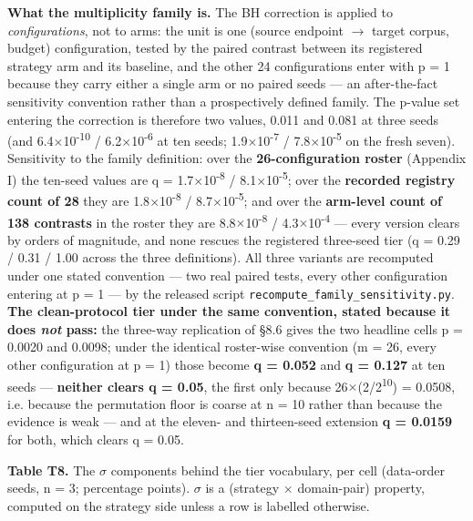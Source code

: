\documentclass[pdflatex,sn-mathphys-ay]{sn-jnl}
\begin{document}
\textbf{What the multiplicity family is.} The BH correction is applied to \emph{configurations}, not to arms: the unit is one (source endpoint \ensuremath{\rightarrow} target corpus, budget) configuration, tested by the paired contrast between its registered strategy arm and its baseline, and the other 24 configurations enter with p = 1 because they carry either a single arm or no paired seeds --- an after-the-fact sensitivity convention rather than a prospectively defined family. The p-value set entering the correction is therefore two values, 0.011 and 0.081 at three seeds (and 6.4\ensuremath{\times}10\textsuperscript{-10} / 6.2\ensuremath{\times}10\textsuperscript{-6} at ten seeds; 1.9\ensuremath{\times}10\textsuperscript{-7} / 7.8\ensuremath{\times}10\textsuperscript{-5} on the fresh seven). Sensitivity to the family definition: over the \textbf{26-configuration roster} (Appendix I) the ten-seed values are q = 1.7\ensuremath{\times}10\textsuperscript{-8} / 8.1\ensuremath{\times}10\textsuperscript{-5}; over the \textbf{recorded registry count of 28} they are 1.8\ensuremath{\times}10\textsuperscript{-8} / 8.7\ensuremath{\times}10\textsuperscript{-5}; and over the \textbf{arm-level count of 138 contrasts} in the roster they are 8.8\ensuremath{\times}10\textsuperscript{-8} / 4.3\ensuremath{\times}10\textsuperscript{-4} --- every version clears by orders of magnitude, and none rescues the registered three-seed tier (q = 0.29 / 0.31 / 1.00 across the three definitions). All three variants are recomputed under one stated convention --- two real paired tests, every other configuration entering at p = 1 --- by the released script \texttt{recompute\_family\_sensitivity.py}. \textbf{The clean-protocol tier under the same convention, stated because it does \emph{not} pass:} the three-way replication of \S{}8.6 gives the two headline cells p = 0.0020 and 0.0098; under the identical roster-wise convention (m = 26, every other configuration at p = 1) those become \textbf{q = 0.052} and \textbf{q = 0.127} at ten seeds --- \textbf{neither clears q = 0.05}, the first only because 26\ensuremath{\times}(2/2\textsuperscript{10}) = 0.0508, i.e. because the permutation floor is coarse at n = 10 rather than because the evidence is weak --- and at the eleven- and thirteen-seed extension \textbf{q = 0.0159} for both, which clears q = 0.05.

\textbf{Table T8.} The \ensuremath{\sigma} components behind the tier vocabulary, per cell (data-order seeds, n = 3; percentage points). \ensuremath{\sigma} is a (strategy \ensuremath{\times} domain-pair) property, computed on the strategy side unless a row is labelled otherwise.
\end{document}
